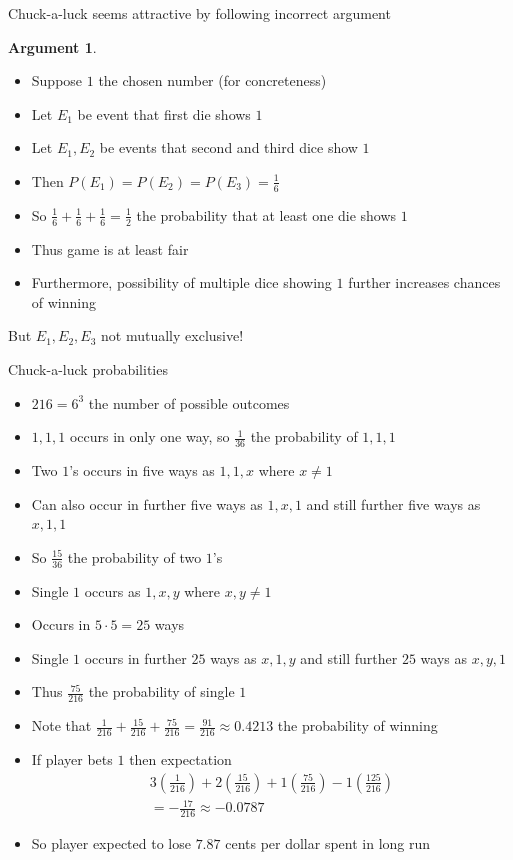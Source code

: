 \documentclass[handout]{beamer}
\theoremstyle{definition}
\newtheorem{argument}{Argument}
\begin{document}
\begin{frame}
Chuck-a-luck seems attractive by following \alert{incorrect} argument
\begin{argument}
\begin{itemize}
\item Suppose $1$ the chosen number (for concreteness)
\item Let $E_1$ be event that first die shows $1$
\item Let $E_1,E_2$ be events that second and third dice show $1$
\item Then $P\left(E_1\right)=P\left(E_2\right)=P\left(E_3\right)
=\frac{1}{6}$
\item So $\frac{1}{6}+\frac{1}{6}+\frac{1}{6}=\frac{1}{2}$
the probability that at least one die shows $1$
\item Thus game is at least fair
\item Furthermore, possibility of \alert{multiple} dice
showing $1$ further increases chances of winning
\end{itemize}
\end{argument}
But $E_1,E_2,E_3$ \alert{not mutually exclusive}!
\end{frame}

\begin{frame}{Chuck-a-luck probabilities}
\begin{itemize}
\item $216=6^3$ the number of possible outcomes
\item $1,1,1$ occurs in only one way, so $\frac{1}{36}$
the probability of $1,1,1$
\item Two $1$'s occurs in five ways as $1,1,x$
where $x\ne 1$
\item Can also occur in further five ways as $1,x,1$
and still further five ways as $x,1,1$
\item So $\frac{15}{36}$ the probability of two $1$'s
\item Single $1$ occurs as $1,x,y$ where $x,y\ne 1$
\item Occurs in $5\cdot 5=25$ ways
\item Single $1$ occurs in further $25$ ways as $x,1,y$
and still further $25$ ways as $x,y,1$
\item Thus $\frac{75}{216}$ the probability of single $1$
\end{itemize}
\end{frame}

\begin{frame}
\begin{itemize}
\item Note that $\frac{1}{216}+\frac{15}{216}+\frac{75}{216}
=\frac{91}{216}\approx 0.4213$ the probability of winning
\item If player bets $1$ then expectation
\begin{multline*}
3\left(\frac{1}{216}\right)
+2\left(\frac{15}{216}\right)+1\left(\frac{75}{216}\right)
-1\left(\frac{125}{216}\right)\\
=-\frac{17}{216}\approx -0.0787
\end{multline*}
\item So player expected to lose $7.87$ cents per dollar spent
in long run
\end{itemize}
\end{frame}
\end{document}
